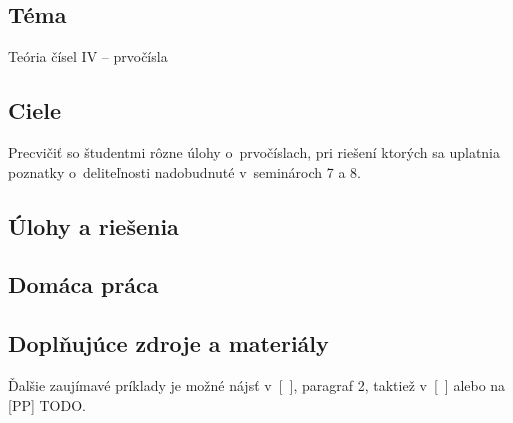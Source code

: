 

\subsection*{Téma}
Teória čísel IV -- prvočísla

\subsection*{Ciele}
Precvičiť so študentmi rôzne úlohy o~prvočíslach, pri riešení ktorých sa uplatnia poznatky o~deliteľnosti nadobudnuté v~seminároch 7 a 8.

\subsection*{Úlohy a riešenia}





















\subsection*{Domáca práca}





\subsection*{Doplňujúce zdroje a materiály}
Ďalšie zaujímavé príklady je možné nájsť v~[~\cite{herman2011}], paragraf 2, taktiež v~[~\cite{holton2010}] alebo na [PP] TODO.
